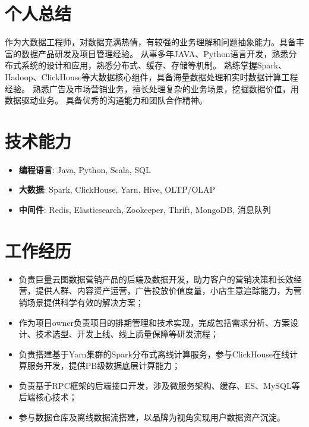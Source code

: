 \documentclass{resume}
\begin{document}

 
\section{个人总结}
作为大数据工程师，对数据充满热情，有较强的业务理解和问题抽象能力。具备丰富的数据产品研发及项目管理经验。
从事多年JAVA、Python语言开发，熟悉分布式系统的设计和应用，熟悉分布式、缓存、存储等机制。
熟练掌握Spark、Hadoop、ClickHouse等大数据核心组件，具备海量数据处理和实时数据计算工程经验。
熟悉广告及市场营销业务，擅长处理复杂的业务场景，挖掘数据价值，用数据驱动业务。
具备优秀的沟通能力和团队合作精神。

\section{技术能力}
\begin{itemize}[parsep=0.2ex]
  \item \textbf{编程语言}: Java, Python, Scala, SQL
  \item \textbf{大数据}: Spark, ClickHouse, Yarn, Hive, OLTP/OLAP
  \item \textbf{中间件}: Redis, Elasticsearch, Zookeeper, Thrift, MongoDB, 消息队列
\end{itemize}

\section{工作经历}
\begin{itemize}
  \item 负责巨量云图数据营销产品的后端及数据开发，助力客户的营销决策和长效经营，提供人群、内容资产运营，广告投放价值度量，小店生意追踪能力，为营销场景提供科学有效的解决方案；
  \item 作为项目owner负责项目的排期管理和技术实现，完成包括需求分析、方案设计、技术选型、开发上线、线上质量保障等研发流程；
  \item 负责搭建基于Yarn集群的Spark分布式离线计算服务，参与ClickHouse在线计算服务开发，提供PB级数据底层计算能力；
  \item 负责基于RPC框架的后端接口开发，涉及微服务架构、缓存、ES、MySQL等后端核心技术；
  \item 参与数据仓库及离线数据流搭建，以品牌为视角实现用户数据资产沉淀。
\end{itemize}
\end{document}
